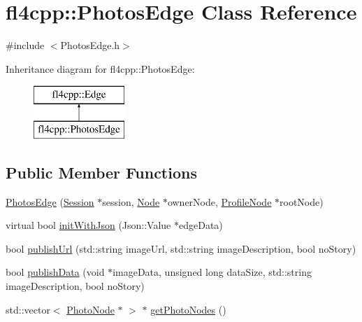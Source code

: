\hypertarget{classfl4cpp_1_1_photos_edge}{}\section{fl4cpp\+:\+:Photos\+Edge Class Reference}
\label{classfl4cpp_1_1_photos_edge}


{\ttfamily \#include $<$Photos\+Edge.\+h$>$}

Inheritance diagram for fl4cpp\+:\+:Photos\+Edge\+:\begin{figure}[H]
\begin{center}
\leavevmode
\includegraphics[height=2.000000cm]{classfl4cpp_1_1_photos_edge}
\end{center}
\end{figure}
\subsection*{Public Member Functions}
\begin{DoxyCompactItemize}
\item 
\hyperlink{classfl4cpp_1_1_photos_edge_a924106be5ebb0cd973a9b5d62d2ead5c}{Photos\+Edge} (\hyperlink{classfl4cpp_1_1_session}{Session} $\ast$session, \hyperlink{classfl4cpp_1_1_node}{Node} $\ast$owner\+Node, \hyperlink{classfl4cpp_1_1_profile_node}{Profile\+Node} $\ast$root\+Node)
\item 
virtual bool \hyperlink{classfl4cpp_1_1_photos_edge_a99c9c7c4e59b51246b13aa9c705a1893}{init\+With\+Json} (Json\+::\+Value $\ast$edge\+Data)
\item 
bool \hyperlink{classfl4cpp_1_1_photos_edge_a9a5a1564fafb5cb425796eab2f9c432e}{publish\+Url} (std\+::string image\+Url, std\+::string image\+Description, bool no\+Story)
\item 
bool \hyperlink{classfl4cpp_1_1_photos_edge_a76862fc603aeb5dc3b144ff94f70c784}{publish\+Data} (void $\ast$image\+Data, unsigned long data\+Size, std\+::string image\+Description, bool no\+Story)
\item 
std\+::vector$<$ \hyperlink{classfl4cpp_1_1_photo_node}{Photo\+Node} $\ast$ $>$ $\ast$ \hyperlink{classfl4cpp_1_1_photos_edge_ab913c926ccef895e4c3e6c385e82f739}{get\+Photo\+Nodes} ()
\end{DoxyCompactItemize}
